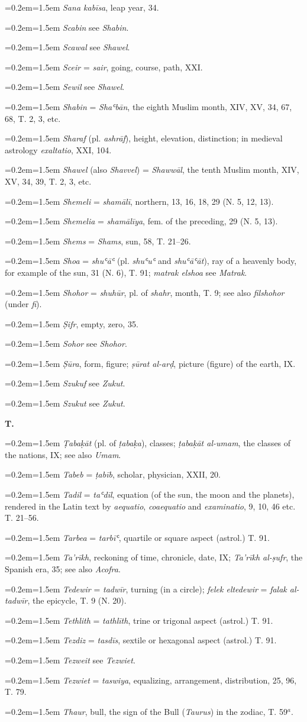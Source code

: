 \documentclass[11pt]{article}
\newcommand{\Pg}[1]{\marginpar{\footnotesize\color{gray}#1}}
\newcommand{\Entry}[1]{\par{\parskip=0.2em\relax\noindent\hangindent=1.5em\hangafter=1 #1\par}}
\begin{document}
\Entry{\emph{Sana kabīsa}, leap year, 34.}
\Entry{\emph{Scabin} see \emph{Shabin}.}
\Entry{\emph{Scawal} see \emph{Shawel}.}
\Entry{\emph{Sceir} = \emph{sair}, going, course, path, XXI.}
\Entry{\emph{Sewil} see \emph{Shawel}.}
\Entry{\emph{Shabin} = \emph{Shaʿbān}, the eighth Muslim month, XIV, XV, 34, 67, 68, T. 2, 3, etc.}
\Entry{\emph{Sharaf} (pl. \emph{ashrāf}), height, elevation, distinction; in medieval astrology \emph{exaltatio}, XXI, 104.}
\Entry{\emph{Shawel} (also \emph{Shavvel}) = \emph{Shawwāl}, the tenth Muslim month, XIV, XV, 34, 39, T. 2, 3, etc.}
\Entry{\Pg{246}\emph{Shemeli} = \emph{shamālī}, northern, 13, 16, 18, 29 (N. 5, 12, 13).}
\Entry{\emph{Shemelia} = \emph{shamālīya}, fem. of the preceding, 29 (N. 5, 13).}
\Entry{\emph{Shems} = \emph{Shams}, sun, 58, T. 21–26.}
\Entry{\emph{Shoa} = \emph{shuʿāʿ} (pl. \emph{shuʿuʿ} and \emph{shuʿāʿāt}), ray of a heavenly body, for example of the sun, 31 (N. 6), T. 91; \emph{matrak elshoa} see \emph{Matrak}.}
\Entry{\emph{Shohor} = \emph{shuhūr}, pl. of \emph{shahr}, month, T. 9; see also \emph{filshohor} (under \emph{fi}).}
\Entry{\emph{Ṣifr}, empty, zero, 35.}
\Entry{\emph{Sohor} see \emph{Shohor}.}
\Entry{\emph{Ṣūra}, form, figure; \emph{ṣūrat al-arḍ}, picture (figure) of the earth, IX.}
\Entry{\emph{Szukuf} see \emph{Zukut}.}
\Entry{\emph{Szukut} see \emph{Zukut}.}
\par\begin{center}\textbf{T.}\end{center}
\Entry{\emph{Ṭabaḳāt} (pl. of \emph{ṭabaḳa}), classes; \emph{ṭabaḳāt al-umam}, the classes of the nations, IX; see also \emph{Umam}.}
\Entry{\emph{Tabeb} = \emph{ṭabīb}, scholar, physician, XXII, 20.}
\Entry{\emph{Tadil} = \emph{taʿdīl}, equation (of the sun, the moon and the planets), rendered in the Latin text by \emph{aequatio}, \emph{coaequatio} and \emph{examinatio}, 9, 10, 46 etc. T. 21–56.}
\Entry{\emph{Tarbea} = \emph{tarbīʿ}, quartile or square aspect (astrol.) T. 91.}
\Entry{\emph{Ta’rīkh}, reckoning of time, chronicle, date, IX; \emph{Ta’rīkh al-ṣufr}, the Spanish era, 35; see also \emph{Acofra}.}
\Entry{\emph{Tedewir} = \emph{tadwīr}, turning (in a circle); \emph{felek eltedewir} = \emph{falak al-tadwīr}, the epicycle, T. 9 (N. 20).}
\Entry{\emph{Tethlith} = \emph{tathlīth}, trine or trigonal aspect (astrol.) T. 91.}
\Entry{\emph{Tezdiz} = \emph{tasdīs}, sextile or hexagonal aspect (astrol.) T. 91.}
\Entry{\emph{Tezweit} see \emph{Tezwiet}.}
\Entry{\emph{Tezwiet} = \emph{taswiya}, equalizing, arrangement, distribution, 25, 96, T. 79.}
\Entry{\emph{Thaur}, bull, the sign of the Bull (\emph{Taurus}) in the zodiac, T. 59$^{a}$.}
\end{document}
